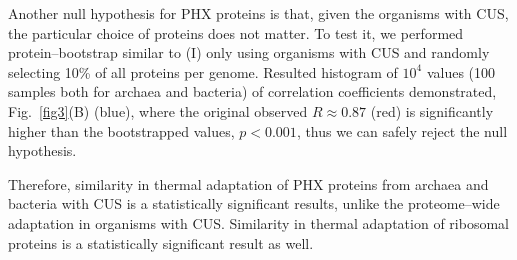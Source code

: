 \documentclass{report}
\begin{document}
Another null hypothesis for PHX proteins is that, given the organisms with CUS, the particular choice of proteins does not matter. To test it, we performed protein--bootstrap similar to (I) only using organisms with CUS and  randomly selecting 10\% of all proteins per genome. Resulted histogram of $10^4$ values (100 samples both for archaea and bacteria) of correlation coefficients demonstrated, Fig.~\ref{fig3}(B) (blue), where the original observed $R\approx0.87$ (red) is significantly higher than the bootstrapped values, $p<0.001$, thus we can safely reject the null hypothesis.

Therefore, similarity in thermal adaptation of PHX proteins from archaea and bacteria with CUS is a statistically significant results, unlike the proteome--wide adaptation in organisms with CUS. Similarity in thermal adaptation of ribosomal proteins is a statistically significant result as well.
\end{document}
